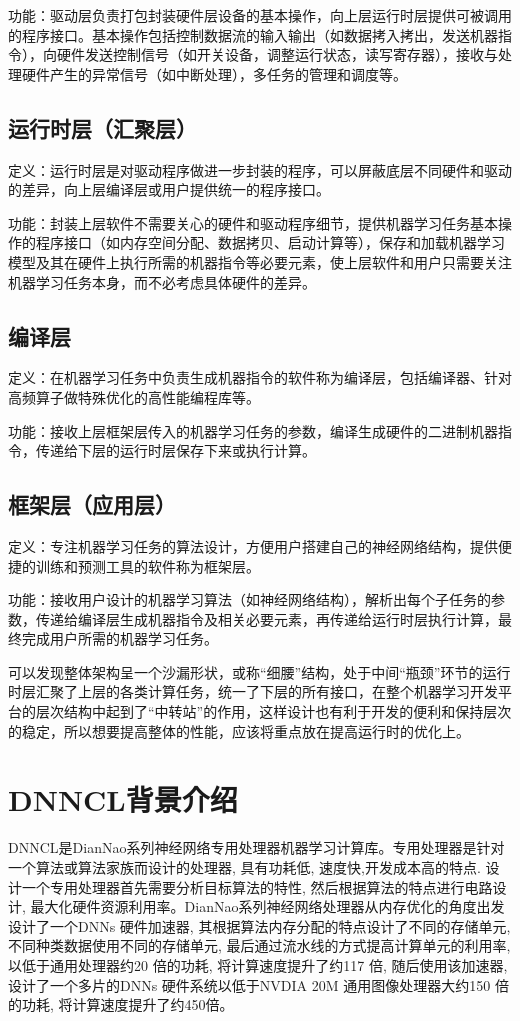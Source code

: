 功能：驱动层负责打包封装硬件层设备的基本操作，向上层运行时层提供可被调用的程序接口。基本操作包括控制数据流的输入输出（如数据拷入拷出，发送机器指令），向硬件发送控制信号（如开关设备，调整运行状态，读写寄存器），接收与处理硬件产生的异常信号（如中断处理），多任务的管理和调度等。

\subsection {运行时层（汇聚层）}
定义：运行时层是对驱动程序做进一步封装的程序，可以屏蔽底层不同硬件和驱动的差异，向上层编译层或用户提供统一的程序接口。

功能：封装上层软件不需要关心的硬件和驱动程序细节，提供机器学习任务基本操作的程序接口（如内存空间分配、数据拷贝、启动计算等），保存和加载机器学习模型及其在硬件上执行所需的机器指令等必要元素，使上层软件和用户只需要关注机器学习任务本身，而不必考虑具体硬件的差异。

\subsection {编译层}
定义：在机器学习任务中负责生成机器指令的软件称为编译层，包括编译器、针对高频算子做特殊优化的高性能编程库等\cite{randy}。

功能：接收上层框架层传入的机器学习任务的参数，编译生成硬件的二进制机器指令，传递给下层的运行时层保存下来或执行计算。

\subsection {框架层（应用层）}
定义：专注机器学习任务的算法设计，方便用户搭建自己的神经网络结构，提供便捷的训练和预测工具的软件称为框架层。

功能：接收用户设计的机器学习算法（如神经网络结构），解析出每个子任务的参数，传递给编译层生成机器指令及相关必要元素，再传递给运行时层执行计算，最终完成用户所需的机器学习任务。

可以发现整体架构呈一个沙漏形状，或称“细腰”结构，处于中间“瓶颈”环节的运行时层汇聚了上层的各类计算任务，统一了下层的所有接口，在整个机器学习开发平台的层次结构中起到了“中转站”的作用，这样设计也有利于开发的便利和保持层次的稳定，所以想要提高整体的性能，应该将重点放在提高运行时的优化上。

\section{DNNCL背景介绍}
DNNCL是DianNao系列神经网络专用处理器机器学习计算库。专用处理器是针对一个算法或算法家族而设计的处理器, 具有功耗低, 速度快,开发成本高的特点. 设计一个专用处理器首先需要分析目标算法的特性, 然后根据算法的特点进行电路设计, 最大化硬件资源利用率\cite{zhanghuawei}。DianNao系列神经网络处理器从内存优化的角度出发设计了一个DNNs 硬件加速器, 其根据算法内存分配的特点设计了不同的存储单元, 不同种类数据使用不同的存储单元, 最后通过流水线的方式提高计算单元的利用率, 以低于通用处理器约20 倍的功耗, 将计算速度提升了约117 倍, 随后使用该加速器, 设计了一个多片的DNNs 硬件系统以低于NVDIA 20M 通用图像处理器大约150 倍的功耗, 将计算速度提升了约450倍。

